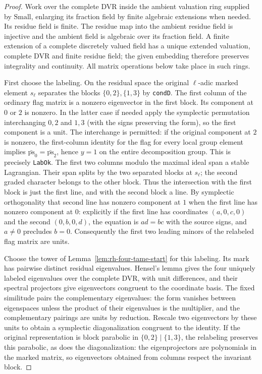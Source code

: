 \begin{proof}
Work over the complete DVR inside the ambient valuation
ring supplied by $\mathrm{Small}$, enlarging its fraction
field by finite algebraic extensions when needed. Its
residue field is finite. The residue map into the ambient
residue field is injective and the ambient field is algebraic
over its fraction field. A finite extension of a complete
discretely valued field has a unique extended valuation,
complete DVR and finite residue field; the given embedding
therefore preserves integrality and continuity. All matrix
operations below take place in such rings.

First choose the labeling. On the residual space the
original $\ell$-adic marked element $s_\ell$ separates
the blocks $\{0,2\},\{1,3\}$ by \texttt{condD}.
The first column of the ordinary flag matrix is a
nonzero eigenvector in the first block. Its component
at $0$ or $2$ is nonzero. In the latter case if needed
apply the symplectic permutation interchanging $0,2$
and $1,3$ (with the signs preserving the form), so the
first component is a unit. The interchange is permitted:
if the original component at $2$ is nonzero, the
first-column identity for the flag for every local group
element implies $\bar{\mathrm{ps}}_0=\bar{\mathrm{ps}}_2$,
hence $y=1$ on the entire decomposition group. This is
precisely \texttt{LabOk}. The first two columns modulo
the maximal ideal span a stable Lagrangian. Their span
splits by the two separated blocks at $s_\ell$; the
second graded character belongs to the other block.
Thus the intersection with the first block is just
the first line, and with the second block a line.
By symplectic orthogonality that second line has
nonzero component at $1$ when the first line has
nonzero component at $0$: explicitly if the first
line has coordinates $(a,0,c,0)$ and the second
$(0,b,0,d)$, the equation is $ad=bc$ with the
source signs, and $a\ne0$ precludes $b=0$.
Consequently the first two leading minors of the
relabeled flag matrix are units.

Choose the tower of Lemma~\ref{lem:rh-four-tame-start}
for this labeling. Its mark has pairwise distinct residual
eigenvalues. Hensel's lemma gives the four uniquely labeled
eigenvalues over the complete DVR, with unit differences,
and their spectral projectors give eigenvectors congruent
to the coordinate basis. The fixed similitude pairs the
complementary eigenvalues: the form vanishes between
eigenspaces unless the product of their eigenvalues is
the multiplier, and the complementary pairings are units
by reduction. Rescale two eigenvectors by these units to
obtain a symplectic diagonalization congruent to the
identity. If the original representation is block
parabolic in $\{0,2\}\mid\{1,3\}$, the relabeling
preserves this parabolic, as does the diagonalization:
the eigenprojectors are polynomials in the marked matrix,
so eigenvectors obtained from columns respect the invariant
block.


\end{proof}

